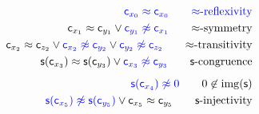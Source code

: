 	\begin{align*}
\colN \mc_{x_0} \mEQ \mc_{x_0}
\tag*{\(\mEQ\)-reflexivity}
\\
{\mc_{x_1} \mEQ \mc_{y_1}} \lor {\colN \mc_{y_1} \mNE \mc_{x_1}}
\tag*{\(\mEQ\)-symmetry}
\\
{\mc_{x_2} \mEQ \mc_{z_2}} \lor {\colN \mc_{x_2} \mNE \mc_{y_2}} \lor {\colN \mc_{y_2}\mNE \mc_{z_2}}
\tag*{\(\mEQ\)-transitivity}
\\
{ \msucc(\mc_{x_3}) \mEQ \msucc(\mc_{y_3})} \lor {\colN \mc_{x_3}\mNE \mc_{y_3}}
\tag*{\(\msucc\)-congruence}
\\[0.5em]
{\colN \msucc(\mc_{x_4})\mNE 0}
\tag*{\(0\not\in\image(\msucc)\)}
\\
{\colN \msucc(\mc_{x_5}) \mNE \msucc(\mc_{y_5})} \lor \mc_{x_5 }\mEQ \mc_{y_5}
\tag*{\(\msucc\)-injectivity}
\end{align*}



%




